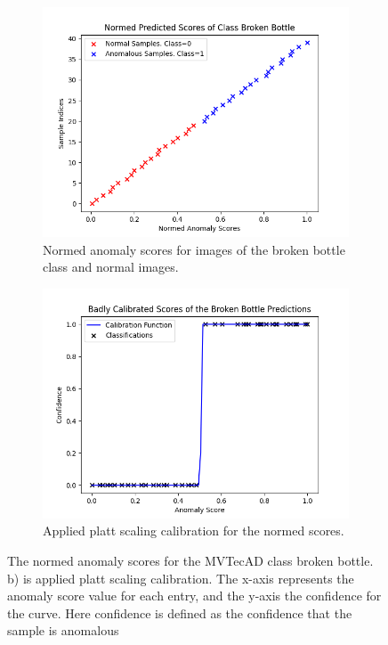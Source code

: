 \begin{figure}[htbp]
    \centering
    \begin{subfigure}[b]{0.45\textwidth}
        \includegraphics[width=\textwidth]{figures/anomaly_scores_sorted.png}
        \caption{Normed anomaly scores for images of the broken bottle class and normal images.}
        \label{fig:scoresNormed}
    \end{subfigure}
    \begin{subfigure}[b]{0.45\textwidth}
        \includegraphics[width=\textwidth]{figures/anomaly_calibration_step.png}
        \caption{Applied platt scaling calibration for the normed scores.}
        \label{fig:platt}
    \end{subfigure}
    \caption{The normed anomaly scores for the MVTecAD \cite{MVTEC_Bergmann_2021} class broken bottle. b) is applied platt scaling calibration. The x-axis represents 
            the anomaly score value for each entry, and the y-axis the confidence for the curve. Here confidence is defined as the confidence that the sample is anomalous}
    \label{fig:badCal}
\end{figure}

